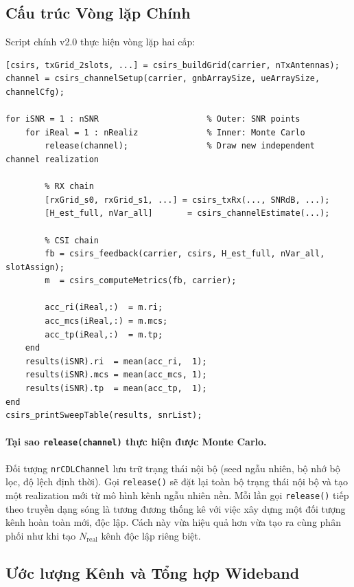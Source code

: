 \documentclass[11pt,a4paper]{article}
\begin{document}
\FloatBarrier
\subsection{Cấu trúc Vòng lặp Chính}

Script chính v2.0 thực hiện vòng lặp hai cấp:

\begin{lstlisting}[style=matlab, caption={V2.0 two-level simulation loop (simplified)}]
% One-time setup (outside all loops)
[csirs, txGrid_2slots, ...] = csirs_buildGrid(carrier, nTxAntennas);
channel = csirs_channelSetup(carrier, gnbArraySize, ueArraySize, channelCfg);

for iSNR = 1 : nSNR                      % Outer: SNR points
    for iReal = 1 : nRealiz              % Inner: Monte Carlo
        release(channel);                % Draw new independent channel realization

        % RX chain
        [rxGrid_s0, rxGrid_s1, ...] = csirs_txRx(..., SNRdB, ...);
        [H_est_full, nVar_all]       = csirs_channelEstimate(...);

        % CSI chain
        fb = csirs_feedback(carrier, csirs, H_est_full, nVar_all, slotAssign);
        m  = csirs_computeMetrics(fb, carrier);

        acc_ri(iReal,:)  = m.ri;
        acc_mcs(iReal,:) = m.mcs;
        acc_tp(iReal,:)  = m.tp;
    end
    results(iSNR).ri  = mean(acc_ri,  1);
    results(iSNR).mcs = mean(acc_mcs, 1);
    results(iSNR).tp  = mean(acc_tp,  1);
end
csirs_printSweepTable(results, snrList);
\end{lstlisting}

\paragraph{Tại sao \texttt{release(channel)} thực hiện được Monte Carlo.}
Đối tượng \texttt{nrCDLChannel} lưu trữ trạng thái nội bộ (seed ngẫu nhiên, bộ nhớ
bộ lọc, độ lệch định thời). Gọi \texttt{release()} sẽ đặt lại toàn bộ trạng thái
nội bộ và tạo một realization mới từ mô hình kênh ngẫu nhiên nền. Mỗi lần gọi
\texttt{release()} tiếp theo truyền dạng sóng là tương đương thống kê với việc
xây dựng một đối tượng kênh hoàn toàn mới, độc lập. Cách này vừa hiệu quả hơn
vừa tạo ra cùng phân phối như khi tạo $N_{\text{real}}$ kênh độc lập riêng biệt.

\subsection{Ước lượng Kênh và Tổng hợp Wideband}
\end{document}
